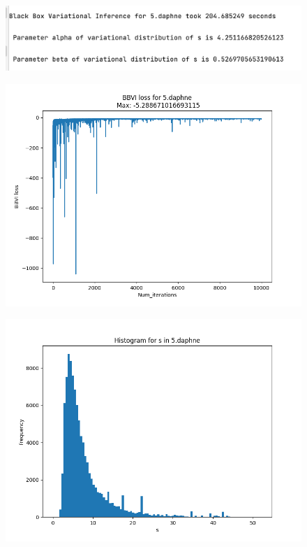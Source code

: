 \documentclass{article}
\begin{document}
\begin{enumerate}
\begin{figure}[!ht]
	\centering
	\includegraphics[scale=0.5]{../figs/5_daphne_results}
\end{figure}

\begin{figure}[!ht]
	\centering
	\includegraphics[scale=0.5]{../figs/5_daphne_ELBO}
\end{figure}

\begin{figure}[!ht]
	\centering
	\includegraphics[scale=0.5]{../figs/5_daphne_s_histogram}
\end{figure}


\end{enumerate}
\end{document}
